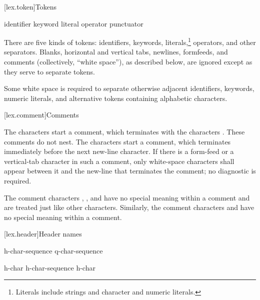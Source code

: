 [lex.token]{Tokens}

%
\begin{bnf}
\br
    identifier\br
    keyword\br
    literal\br
    operator\br
    punctuator
\end{bnf}

\pnum
{}%
There are five kinds of tokens: identifiers, keywords, literals,\footnote{Literals include strings and character and numeric literals.
}
operators, and other separators.
%
Blanks, horizontal and vertical tabs, newlines, formfeeds, and comments
(collectively, ``white space''), as described below, are ignored except
as they serve to separate tokens. \begin{note} Some white space is
required to separate otherwise adjacent identifiers, keywords, numeric
literals, and alternative tokens containing alphabetic characters.
\end{note}%

[lex.comment]{Comments}

\pnum
{}%
%
%
The characters \tcode{/*} start a comment, which terminates with the
characters \tcode{*/}. These comments do not nest.
%
The characters \tcode{//} start a comment, which terminates immediately before the
next new-line character. If there is a form-feed or a vertical-tab
character in such a comment, only white-space characters shall appear
between it and the new-line that terminates the comment; no diagnostic
is required. \begin{note} The comment characters \tcode{//}, \tcode{/*},
and \tcode{*/} have no special meaning within a \tcode{//} comment and
are treated just like other characters. Similarly, the comment
characters \tcode{//} and \tcode{/*} have no special meaning within a
\tcode{/*} comment. \end{note}%

[lex.header]{Header names}

%
\begin{bnf}
\br
    \terminal{<} h-char-sequence \terminal{>}\br
     q-char-sequence 
\end{bnf}

\begin{bnf}
\br
    h-char\br
    h-char-sequence h-char
\end{bnf}

